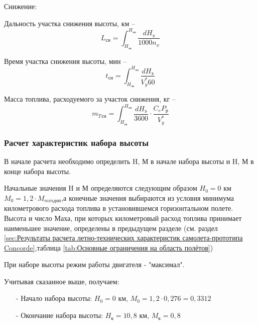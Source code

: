 \begin{center}
    Снижение:
\end{center}

Дальность участка снижения высоты, км -- 
\begin{equation}
    \label{eq:Дальность участка снижения высоты}
    L_\text{сн} = \int_{H_\text{эк}}^{H_\text{эн}}\frac{dH_\text{э}}{1000 n_x}
\end{equation}

Время участка снижения высоты, мин -- 
\begin{equation}
    \label{eq:Время участка снижения высоты}
    t_\text{сн} = \int_{H_\text{эк}}^{H_\text{эн}}\frac{dH_\text{э}}{V_y^* 60}
\end{equation}

Масса топлива, расходуемого за участок снижения, кг -- 
\begin{equation}
    \label{eq:Масса топлива, расходуемого за участок снижения}
    m_T{_\text{сн}} = \int_{H_\text{эк}}^{H_\text{эн}}\frac{dH_\text{э}}{3600} \cdot \frac{C_eP_\text{р}}{V_y^*}
\end{equation}

\subsubsection{Расчет характеристик набора высоты}

В начале расчета необходимо определить H, М в начале набора высоты и
H, М в конце набора высоты.

Начальные значения H и М определяются следующим образом $H_0 = 0 $ км $M_0 = 1,2 \cdot M_{min \text{доп}}$,а конечные значения выбираются из условия минимума километрового расхода топлива в установившемся горизонтальном полете. Высота и число Маха, при которых километровый расход топлива принимает наименьшее значение, определены в предыдущем разделе (см. раздел \ref{sec:Результаты расчета летно-технических характеристик
самолета-прототипа Concorde},таблица \ref{tab:Основные ограничения на область полётов}) 

При наборе высоты режим работы двигателя - "максимал". 

Учитывая сказанное выше, получаем:
\begin{itemize}
    \item [-] Начало набора высоты: $H_0 = 0$ км, $M_0 = 1,2 \cdot 0,276 = 0,3312$
    \item [-] Окончание набора высоты: $H_\text{к} = 10,8$ км, $M_\text{к} = 0,8$
\end{itemize}

